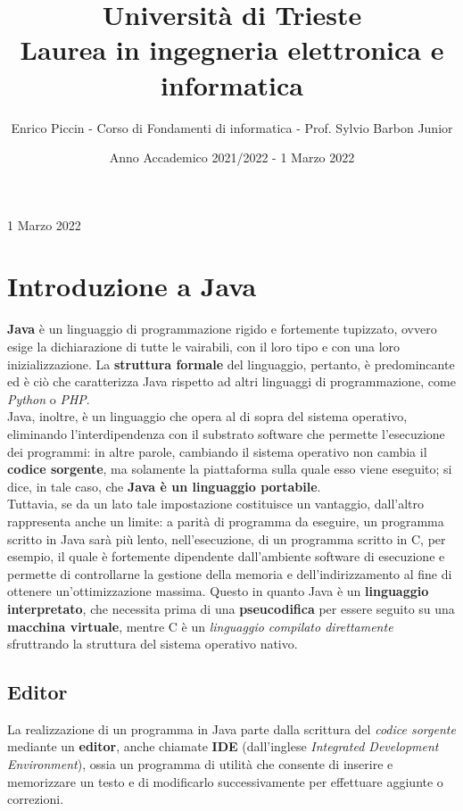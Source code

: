 \documentclass[a4paper]{extarticle}
\title{\textbf{Università di Trieste\\ \vspace{1em}
Laurea in ingegneria elettronica e informatica}}
\author{Enrico Piccin - Corso di Fondamenti di informatica - Prof. Sylvio Barbon Junior}
\date{Anno Accademico 2021/2022 - 1 Marzo 2022}
\begin{document}
\vspace{-10mm}
\maketitle

\tableofcontents
\newpage

\noindent
\begin{center}
  1 Marzo 2022
\end{center}

\section{Introduzione a Java}
\textbf{Java} è un linguaggio di programmazione rigido e fortemente tupizzato, ovvero esige la dichiarazione di tutte le vairabili, con il loro tipo e con una loro inizializzazione. La \textbf{struttura formale} del linguaggio, pertanto, è predomincante ed è ciò che caratterizza Java rispetto ad altri linguaggi di programmazione, come \emph{Python} o \emph{PHP}.\\
Java, inoltre, è un linguaggio che opera al di sopra del sistema operativo, eliminando l'interdipendenza con il substrato software che permette l'esecuzione dei programmi: in altre parole, cambiando il sistema operativo non cambia il \textbf{codice sorgente}, ma solamente la piattaforma sulla quale esso viene eseguito; si dice, in tale caso, che \textbf{Java è un linguaggio portabile}.\\
Tuttavia, se da un lato tale impostazione costituisce un vantaggio, dall'altro rappresenta anche un limite: a parità di programma da eseguire, un programma scritto in Java sarà più lento, nell'esecuzione, di un programma scritto in C, per esempio, il quale è fortemente dipendente dall'ambiente software di esecuzione e permette di controllarne la gestione della memoria e dell'indirizzamento al fine di ottenere un'ottimizzazione massima. Questo in quanto Java è un \textbf{linguaggio interpretato}, che necessita prima di una \textbf{pseucodifica} per essere seguito su una \textbf{macchina virtuale}, mentre C è un \emph{linguaggio compilato direttamente} sfruttrando la struttura del sistema operativo nativo.

\vspace{1em}
\subsection{Editor}
La realizzazione di un programma in Java parte dalla scrittura del \emph{codice sorgente} mediante un \textbf{editor}, anche chiamate \textbf{IDE} (dall'inglese \emph{Integrated Development Environment}), ossia un programma di utilità che consente di inserire e memorizzare un testo e di modificarlo successivamente per effettuare aggiunte o correzioni.
\end{document}
